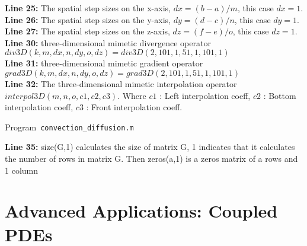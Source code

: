 \textbf{Line 25:} The spatial step sizes on the x-axis, $ dx = (b-a)/m$, this case $dx = 1$.\\

\textbf{Line 26:} The spatial step sizes on the y-axis, $ dy = (d-c)/n$, this case $dy = 1$.\\

\textbf{Line 27:} The spatial step sizes on the z-axis, $ dz = (f-e)/o$, this case $dz = 1$.\\

\textbf{Line 30:} three-dimensional mimetic divergence operator $div3D(k,m,dx,n,dy,o,dz)=div3D(2,101,1,51,1,101,1)$\\

\textbf{Line 31:} three-dimensional mimetic gradient operator $grad3D(k,m,dx,n,dy,o,dz)=grad3D(2,101,1,51,1,101,1)$\\

\textbf{Line 32:} The three-dimensional mimetic interpolation operator
$interpol3D(m, n, o, c1, c2, c3)$.  Where $c1$ : Left interpolation coeff, $c2$ : Bottom interpolation coeff, $c3$ : Front interpolation coeff.\\

\begin{listing}[ht!]
	\tiny
	\centering
	\caption{Program~\texttt{convection\_diffusion.m}}
	\label{code:convection_diffusion.m}
\end{listing}

\textbf{Line 35:} size(G,1) calculates the size of matrix G, 1 indicates that it calculates the number of rows in matrix G. Then zeros(a,1) is a zeros matrix of a rows and 1 column







\section{Advanced Applications: Coupled PDEs}
